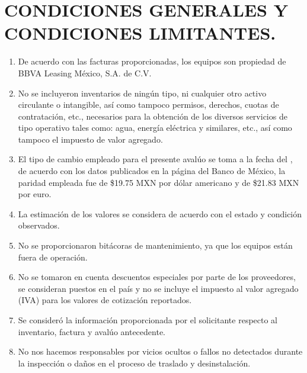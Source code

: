 \chapter{CONDICIONES GENERALES Y CONDICIONES LIMITANTES.} %

\begin{enumerate}
	\item De acuerdo con las facturas proporcionadas, los equipos son propiedad de BBVA Leasing México, S.A. de C.V.
	\item No se incluyeron inventarios de ningún tipo, ni cualquier otro activo circulante o intangible, así como tampoco permisos, derechos, cuotas de contratación, etc., necesarios para la obtención de los diversos servicios de tipo operativo tales como: agua, energía eléctrica y similares, etc., así como tampoco el impuesto de valor agregado.
	\item El tipo de cambio empleado para el presente avalúo se toma a la fecha del \fechaInforme, de acuerdo con los datos publicados en la página del Banco de México, la paridad empleada fue de \$19.75 MXN por dólar americano y de \$21.83 MXN por euro.
	\item La estimación de los valores se considera de acuerdo con el estado y condición observados.
	\item No se proporcionaron bitácoras de mantenimiento, ya que los equipos están fuera de operación.
	\item No se tomaron en cuenta descuentos especiales por parte de los proveedores, se consideran puestos en el país y no se incluye el impuesto al valor agregado (IVA) para los valores de cotización reportados.
	\item Se consideró la información proporcionada por el solicitante respecto al inventario, factura y avalúo antecedente.
	\item No nos hacemos responsables por vicios ocultos o fallos no detectados durante la inspección o daños en el proceso de traslado y desinstalación.
\end{enumerate}

